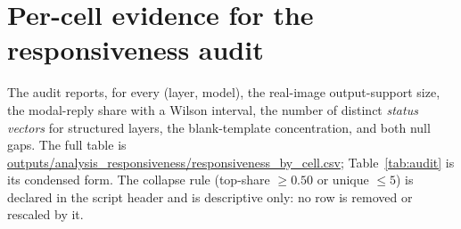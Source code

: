 \section{Per-cell evidence for the responsiveness audit}

\label{app:cell}

The audit reports, for every (layer, model), the real-image output-support size, the modal-reply share with a Wilson interval, the number of distinct \emph{status vectors} for structured layers, the blank-template concentration, and both null gaps. The full table is \url{outputs/analysis_responsiveness/responsiveness_by_cell.csv}; Table~\ref{tab:audit} is its condensed form. The collapse rule (top-share $\ge 0.50$ or unique $\le 5$) is declared in the script header and is descriptive only: no row is removed or rescaled by it.

